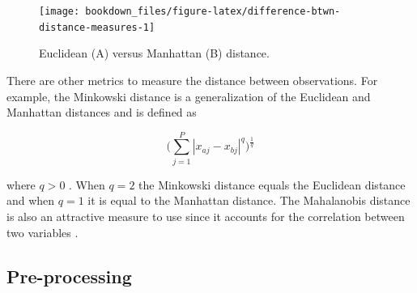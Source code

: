 \documentclass[]{krantz}
\makeatletter
\newenvironment{Shaded}{\begin{snugshade}}{\end{snugshade}}
\newcommand{\CommentTok}[1]{\textcolor[rgb]{0.37,0.37,0.37}{\textit{#1}}}
\newcommand{\DataTypeTok}[1]{\textcolor[rgb]{0.27,0.27,0.27}{#1}}
\newcommand{\DecValTok}[1]{\textcolor[rgb]{0.06,0.06,0.06}{#1}}
\newcommand{\KeywordTok}[1]{\textcolor[rgb]{0.27,0.27,0.27}{\textbf{#1}}}
\newcommand{\NormalTok}[1]{#1}
\newcommand{\OperatorTok}[1]{\textcolor[rgb]{0.43,0.43,0.43}{\textbf{#1}}}
\newcommand{\StringTok}[1]{\textcolor[rgb]{0.5,0.5,0.5}{#1}}
\newenvironment{kframe}{%
\medskip{}
\setlength{\fboxsep}{.8em}
 \def\at@end@of@kframe{}%
 \ifinner\ifhmode%
  \def\at@end@of@kframe{\end{minipage}}%
  \begin{minipage}{\columnwidth}%
 \fi\fi%
 \def\FrameCommand##1{\hskip\@totalleftmargin \hskip-\fboxsep
 \colorbox{shadecolor}{##1}\hskip-\fboxsep
     \hskip-\linewidth \hskip-\@totalleftmargin \hskip\columnwidth}%
 \MakeFramed {\advance\hsize-\width
   \@totalleftmargin\z@ \linewidth\hsize
   \@setminipage}}%
 {\par\unskip\endMakeFramed%
 \at@end@of@kframe}
\renewenvironment{Shaded}{\begin{kframe}}{\end{kframe}}
\makeatother
\begin{document}
\begin{Shaded}
\end{Shaded}

\begin{figure}

{\centering \texttt{[image: bookdown\_files/figure-latex/difference-btwn-distance-measures-1]} 

}

\caption{Euclidean (A) versus Manhattan (B) distance.}\label{fig:difference-btwn-distance-measures}
\end{figure}

There are other metrics to measure the distance between observations. For example, the Minkowski distance is a generalization of the Euclidean and Manhattan distances and is defined as

\begin{equation}
\label{eq:minkowski}
 \bigg( \sum^P_{j=1} | x_{aj} - x_{bj} | ^q \bigg)^{\frac{1}{q}}
\end{equation}

where \(q > 0\) \citep{han2011data}. When \(q = 2\) the Minkowski distance equals the Euclidean distance and when \(q = 1\) it is equal to the Manhattan distance. The Mahalanobis distance is also an attractive measure to use since it accounts for the correlation between two variables \citep{de2000mahalanobis}.

\hypertarget{knn-preprocess}{%
\subsection{Pre-processing}\label{knn-preprocess}}
\end{document}
